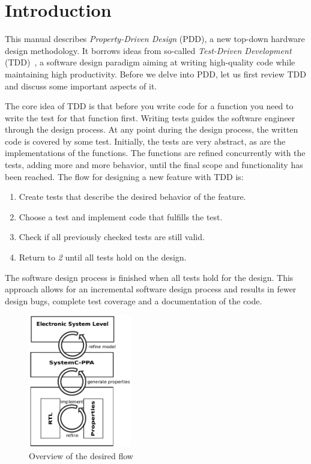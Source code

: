 \newpage
\section{Introduction}
\label{sec:introduction}

This manual describes \textit{Property-Driven Design} (PDD), a new
top-down hardware design methodology. %
It borrows ideas from so-called \textit{Test-Driven Development}
(TDD)~\cite{2002-Beck}, a software design paradigm aiming at writing high-quality code
while maintaining high productivity. %
Before we delve into PDD, let us first review TDD and discuss some
important aspects of it. 

The core idea of TDD is that before you write code for a function you
need to write the test for that function first. %
Writing tests guides the software engineer through the design
process. %
At any point during the design process, the written code is covered by
some test. Initially, the tests are very abstract, as are the
implementations of the functions. %
The functions are refined concurrently with the tests, adding more and
more behavior, until the final scope and functionality has been
reached. The flow for designing a new feature with TDD is:
\begin{enumerate}
\item Create tests that describe the desired behavior of the feature. %
\item Choose a test and implement code that fulfills the test. %
\item Check if all previously checked tests are still valid. %
\item Return to \textit{2} until all tests hold on the design. %
\end{enumerate}

The software design process is finished when all tests hold for the
design. %
This approach allows for an incremental software design process and
results in fewer design bugs, complete test coverage and a
documentation of the code. %

 \begin{figure}
     \caption{Overview of the desired flow}
     \label{fig:PDD-overview}
     \includegraphics[width=0.4\textwidth]{fig/drawing.pdf}
 \end{figure}

